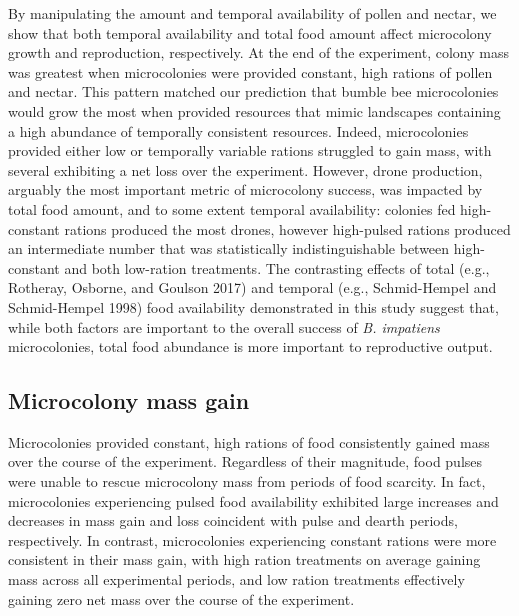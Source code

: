 \documentclass[11pt,]{article}
\begin{document}
By manipulating the amount and temporal availability of pollen and
nectar, we show that both temporal availability and total food amount
affect microcolony growth and reproduction, respectively. At the end of
the experiment, colony mass was greatest when microcolonies were
provided constant, high rations of pollen and nectar. This pattern
matched our prediction that bumble bee microcolonies would grow the most
when provided resources that mimic landscapes containing a high
abundance of temporally consistent resources. Indeed, microcolonies
provided either low or temporally variable rations struggled to gain
mass, with several exhibiting a net loss over the experiment. However,
drone production, arguably the most important metric of microcolony
success, was impacted by total food amount, and to some extent temporal
availability: colonies fed high-constant rations produced the most
drones, however high-pulsed rations produced an intermediate number that
was statistically indistinguishable between high-constant and both
low-ration treatments. The contrasting effects of total (e.g., Rotheray,
Osborne, and Goulson 2017) and temporal (e.g., Schmid-Hempel and
Schmid-Hempel 1998) food availability demonstrated in this study suggest
that, while both factors are important to the overall success of
\emph{B. impatiens} microcolonies, total food abundance is more
important to reproductive output.

\hypertarget{microcolony-mass-gain}{%
\subsection{Microcolony mass gain}\label{microcolony-mass-gain}}

Microcolonies provided constant, high rations of food consistently
gained mass over the course of the experiment. Regardless of their
magnitude, food pulses were unable to rescue microcolony mass from
periods of food scarcity. In fact, microcolonies experiencing pulsed
food availability exhibited large increases and decreases in mass gain
and loss coincident with pulse and dearth periods, respectively. In
contrast, microcolonies experiencing constant rations were more
consistent in their mass gain, with high ration treatments on average
gaining mass across all experimental periods, and low ration treatments
effectively gaining zero net mass over the course of the experiment.
\end{document}
